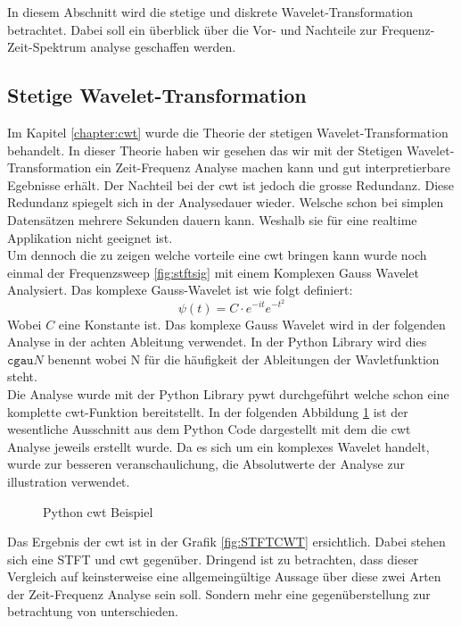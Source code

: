 
In diesem Abschnitt wird die stetige und diskrete Wavelet-Transformation betrachtet. Dabei soll ein überblick über die Vor- und Nachteile zur Frequenz-Zeit-Spektrum analyse geschaffen werden. 



\subsection{Stetige Wavelet-Transformation} 
Im Kapitel \ref{chapter:cwt} wurde die Theorie der stetigen Wavelet-Transformation behandelt. In dieser Theorie haben wir gesehen das wir mit der Stetigen Wavelet-Transformation ein Zeit-Frequenz Analyse machen kann und gut interpretierbare Egebnisse erhält. Der Nachteil bei der cwt ist jedoch die grosse Redundanz. Diese Redundanz spiegelt sich in der Analysedauer wieder. Welsche schon bei simplen Datensätzen mehrere Sekunden dauern kann. Weshalb sie für eine realtime Applikation nicht geeignet ist.\\
Um dennoch die zu zeigen welche vorteile eine cwt bringen kann wurde noch einmal der Frequenzsweep \ref{fig:stftsig} mit einem Komplexen Gauss Wavelet Analysiert. Das komplexe Gauss-Wavelet ist wie folgt definiert:
\begin{equation}
\psi(t)=C \cdot e^{-it} e^{-t^{2}}
\label{eq:cgau}
\end{equation}
Wobei $C$ eine Konstante ist. Das komplexe Gauss Wavelet wird in der folgenden Analyse in der achten Ableitung verwendet. In der Python Library wird dies $\texttt{cgau}N$ benennt wobei N für die häufigkeit der Ableitungen der Wavletfunktion steht.\\

Die Analyse wurde mit der Python Library pywt durchgeführt welche schon eine komplette cwt-Funktion bereitstellt. In der folgenden Abbildung \ref{fig:python-cwt} ist der wesentliche Ausschnitt aus dem Python Code dargestellt mit dem die cwt Analyse jeweils erstellt wurde. Da es sich um ein komplexes Wavelet handelt, wurde zur besseren veranschaulichung, die Absolutwerte der Analyse zur illustration verwendet.\\

\begin{figure}
	\centering
	
	\caption{Python cwt Beispiel}
	\label{fig:python-cwt}
\end{figure}

Das Ergebnis der cwt ist in der Grafik \ref{fig:STFTCWT} ersichtlich. Dabei stehen sich eine STFT und cwt gegenüber. Dringend ist zu betrachten, dass dieser Vergleich auf keinsterweise eine allgemeingültige Aussage über diese zwei Arten der Zeit-Frequenz Analyse sein soll. Sondern mehr eine gegenüberstellung zur betrachtung von unterschieden. 


